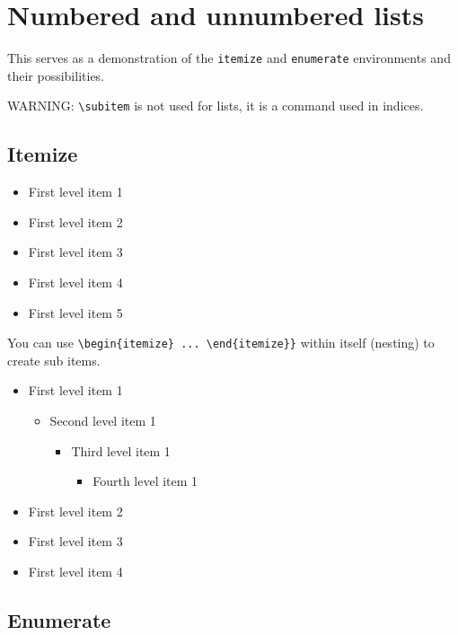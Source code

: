 \section{Numbered and unnumbered lists}
This serves as a demonstration of the \verb|itemize| and \verb|enumerate| environments and their possibilities.

\textcolor[rgb]{0.7, 0, 0}{WARNING}: \verb|\subitem| is not used for lists, it is a command used in indices.

\subsection{Itemize}

    \begin{itemize}
        \item First level item 1
        \item First level item 2
        \item First level item 3
        \item First level item 4
        \item First level item 5
    \end{itemize}

    You can use \verb|\begin{itemize} ... \end{itemize}}| within itself (nesting) to create sub items.

    \begin{itemize}
        \item First level item 1
        \begin{itemize}
            \item Second level item 1
            \begin{itemize}
                \item Third level item 1
                \begin{itemize}
                    \item Fourth level item 1
                \end{itemize}
            \end{itemize}
        \end{itemize}
        \item First level item 2
        \item First level item 3
        \item First level item 4
    \end{itemize}

\subsection{Enumerate}

